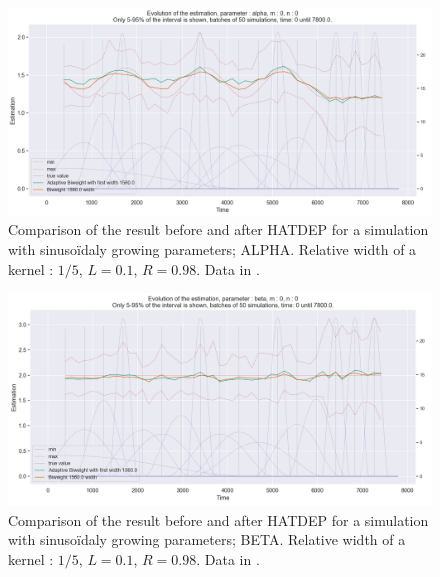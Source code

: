 \begin{figure}
\centering
\includegraphics[width = 0.90 \textwidth]{../imag/chap3/4/M.png}
\caption{Comparison of the result before and after HATDEP for a simulation with sinusoïdaly growing parameters; ALPHA. Relative width of a kernel : $1/5$, $L = 0.1$, $R = 0.98$. Data in \protect {}.}
\label{fig:first_estimate_4_alpha}
\end{figure}

\begin{figure}
\centering
\includegraphics[width = 0.90 \textwidth]{../imag/chap3/4/N.png}
\caption{Comparison of the result before and after HATDEP for a simulation with sinusoïdaly growing parameters; BETA. Relative width of a kernel : $1/5$, $L = 0.1$, $R = 0.98$. Data in \protect {}.}
\label{fig:first_estimate_4_beta}
\end{figure}

